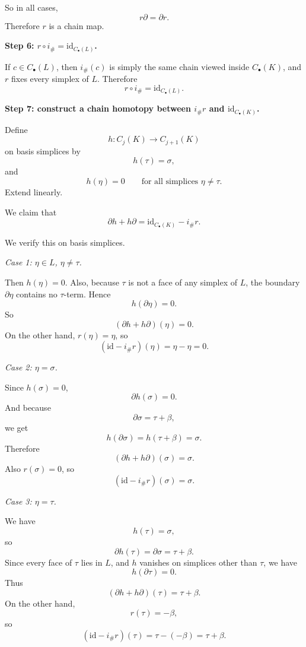 \begin{solution}
So in all cases,
\[
r\partial=\partial r.
\]
Therefore \(r\) is a chain map.

\par

\textbf{Step 6: \(r\circ i_\#=\mathrm{id}_{C_\bullet(L)}\).}

If \(c\in C_\bullet(L)\), then \(i_\#(c)\) is simply the same chain viewed inside \(C_\bullet(K)\), and \(r\) fixes every simplex of \(L\). Therefore
\[
r\circ i_\# = \mathrm{id}_{C_\bullet(L)}.
\]

\par

\textbf{Step 7: construct a chain homotopy between \(i_\# r\) and \(\mathrm{id}_{C_\bullet(K)}\).}

Define
\[
h:C_j(K)\to C_{j+1}(K)
\]
on basis simplices by
\[
h(\tau)=\sigma,
\]
and
\[
h(\eta)=0
\qquad\text{for all simplices } \eta\neq \tau.
\]
Extend linearly.

We claim that
\[
\partial h + h\partial = \mathrm{id}_{C_\bullet(K)} - i_\# r.
\]

We verify this on basis simplices.

\par

\emph{Case 1: \(\eta\in L\), \(\eta\neq \tau\).}

Then \(h(\eta)=0\). Also, because \(\tau\) is not a face of any simplex of \(L\), the boundary \(\partial \eta\) contains no \(\tau\)-term. Hence
\[
h(\partial \eta)=0.
\]
So
\[
(\partial h+h\partial)(\eta)=0.
\]
On the other hand, \(r(\eta)=\eta\), so
\[
(\mathrm{id}-i_\# r)(\eta)=\eta-\eta=0.
\]

\par

\emph{Case 2: \(\eta=\sigma\).}

Since \(h(\sigma)=0\),
\[
\partial h(\sigma)=0.
\]
And because
\[
\partial \sigma=\tau+\beta,
\]
we get
\[
h(\partial \sigma)=h(\tau+\beta)=\sigma.
\]
Therefore
\[
(\partial h+h\partial)(\sigma)=\sigma.
\]
Also \(r(\sigma)=0\), so
\[
(\mathrm{id}-i_\# r)(\sigma)=\sigma.
\]

\par

\emph{Case 3: \(\eta=\tau\).}

We have
\[
h(\tau)=\sigma,
\]
so
\[
\partial h(\tau)=\partial \sigma=\tau+\beta.
\]
Since every face of \(\tau\) lies in \(L\), and \(h\) vanishes on simplices other than \(\tau\), we have
\[
h(\partial \tau)=0.
\]
Thus
\[
(\partial h+h\partial)(\tau)=\tau+\beta.
\]
On the other hand,
\[
r(\tau)=-\beta,
\]
so
\[
(\mathrm{id}-i_\# r)(\tau)=\tau-(-\beta)=\tau+\beta.
\]


\end{solution}
